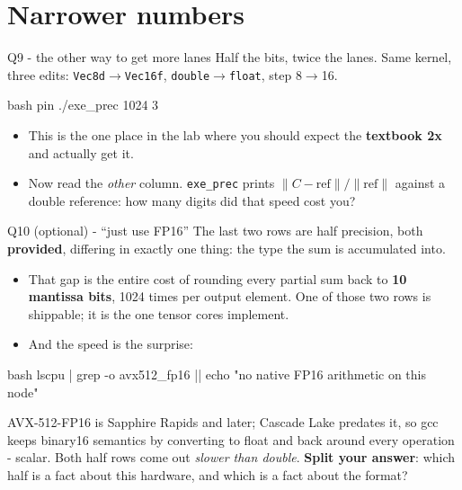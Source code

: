 \documentclass[aspectratio=169]{beamer}
\newcommand{\cplx}[1]{{\footnotesize\color{cookieMuted}#1}}
\begin{document}
\section{Narrower numbers}

\begin{frame}[fragile]{Q9 - the other way to get more lanes}
  Half the bits, twice the lanes. Same kernel, three edits:
  \texttt{Vec8d}$\to$\texttt{Vec16f}, \texttt{double}$\to$\texttt{float},
  step 8$\to$16.
  \begin{cookiecode}[title={the same multiply in four precisions, same inputs}]{bash}
pin ./exe_prec 1024 3
  \end{cookiecode}
  \medskip
  \begin{itemize}\setlength\itemsep{4pt}
    \item This is the one place in the lab where you should expect the
      \textbf{textbook 2x} and actually get it.
    \item Now read the \emph{other} column. \texttt{exe\_prec} prints
      $\|C-\text{ref}\|/\|\text{ref}\|$ against a double reference: how many
      digits did that speed cost you?
  \end{itemize}
\end{frame}

\begin{frame}[fragile]{Q10 (optional) - ``just use FP16''}
  The last two rows are half precision, both \textbf{provided}, differing in
  exactly one thing: the type the sum is accumulated into.
  \pause
  \begin{itemize}\setlength\itemsep{4pt}
    \item That gap is the entire cost of rounding every partial sum back to
      \textbf{10 mantissa bits}, 1024 times per output element. One of those
      two rows is shippable; it is the one tensor cores implement.
    \item And the speed is the surprise:
  \end{itemize}
  \begin{cookiecode}[title={check the hardware before you believe a timing}]{bash}
lscpu | grep -o avx512_fp16 || echo "no native FP16 arithmetic on this node"
  \end{cookiecode}
  \cplx{AVX-512-FP16 is Sapphire Rapids and later; Cascade Lake predates it,
  so gcc keeps binary16 semantics by converting to float and back around
  every operation - scalar. Both half rows come out \emph{slower than
  double}.}
  \medskip
  \textbf{Split your answer}: which half is a fact about this hardware, and
  which is a fact about the format?
\end{frame}


\end{document}
